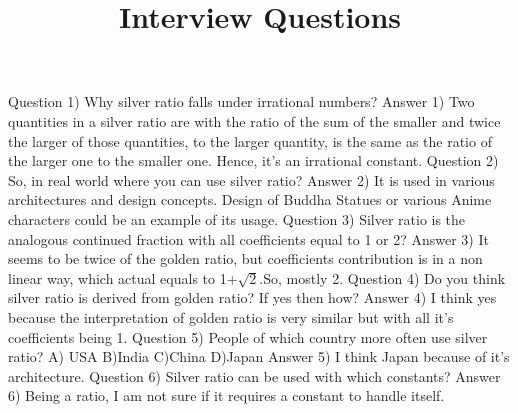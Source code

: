 \documentclass[12pt]{article}
\begin{document}
\title{Interview Questions}
\date{\vspace{-5ex}}
\maketitle

\section{}
Question 1) Why silver ratio falls under irrational numbers?
\newline
Answer 1) Two quantities in a silver ratio are with the ratio of the sum of the smaller and twice the larger of those quantities, to the larger quantity, is the same as the ratio of the larger one to the smaller one. Hence, it’s an irrational constant.    
\newline
\newline
Question 2) So, in real world where you can use silver ratio?
\newline
Answer 2) It is used in various architectures and design concepts. Design of Buddha Statues or various Anime characters could be an example of its usage.
\newline
\newline
Question 3) Silver ratio is the analogous continued fraction with all coefficients equal to 1 or 2?
\newline
Answer 3) It seems to be twice of the golden ratio, but coefficients contribution is in a non linear way, which actual equals to 1+$\sqrt{2}$.So, mostly 2.
\newline
\newline
Question 4) Do you think silver ratio is derived from golden ratio? If yes then how?
\newline
Answer 4) I think yes because the interpretation of golden ratio is very similar but with all it’s coefficients being 1.
\newline
\newline
Question 5) People of which country more often use silver ratio?
\newline
A) USA  B)India  C)China    D)Japan
\newline
Answer 5) I think Japan because of it’s architecture.
\newline
\newline
Question 6) Silver ratio can be used with which constants?
\newline
Answer 6) Being a ratio, I am not sure if it requires a constant to handle itself.
\newline
\end{document}

